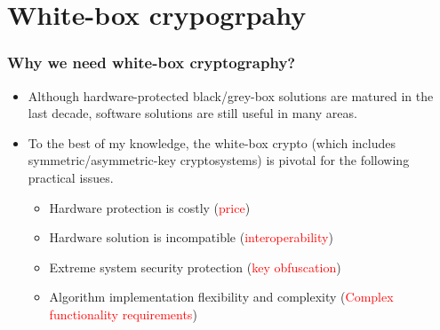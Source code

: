 \documentclass[aspectratio=169,xcolor=dvipsnames]{beamer}
\begin{document}
\section{White-box crypogrpahy}


\frame
{
\frametitle{Why we need white-box cryptography?}
\begin{itemize}
\setlength{\itemsep}{12pt}
\item Although hardware-protected black/grey-box solutions are matured in the last decade, software solutions are still useful in many areas.

\item To the best of my knowledge, the white-box crypto (which includes symmetric/asymmetric-key cryptosystems) is pivotal for the following practical issues.
\begin{itemize}
\setlength{\itemsep}{12pt}
\item Hardware protection is costly (\textcolor{red}{price})
\item Hardware solution is incompatible (\textcolor{red}{interoperability})
\item Extreme system security protection (\textcolor{red}{key obfuscation})
\item Algorithm implementation flexibility and complexity (\textcolor{red}{Complex functionality requirements})
\end{itemize}
\end{itemize}

}
\end{document}
